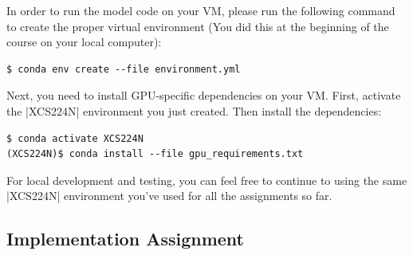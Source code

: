 In order to run the model code on your VM, please run the following command to create the proper virtual environment (You did this at the beginning of the course on your local computer):

\begin{lstlisting}
$ conda env create --file environment.yml
\end{lstlisting}

Next, you need to install GPU-specific dependencies on your VM.  First, activate the |XCS224N| environment you just created.  Then install the dependencies:

\begin{lstlisting}
$ conda activate XCS224N
(XCS224N)$ conda install --file gpu_requirements.txt
\end{lstlisting}

For local development and testing, you can feel free to continue to using the same |XCS224N| environment you've used for all the assignments so far.

\subsection*{Implementation Assignment}

